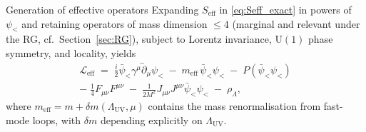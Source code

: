 \documentclass[11pt,a4paper]{article}
\theoremstyle{definition}
\theoremstyle{remark}
\begin{document}
	Generation of effective operators
		\label{prop:operators}
		Expanding $S_{\mathrm{eff}}$ in \eqref{eq:Seff_exact} in powers of $\psi_{<}$
		and retaining operators of mass dimension $\leq 4$ (marginal and relevant
		under the RG, cf.\ Section~\ref{sec:RG}), subject to Lorentz invariance,
		$\mathrm{U}(1)$ phase symmetry, and locality, yields
		\begin{multline}
			\mathcal{L}_{\mathrm{eff}}
			\;=\;
			\frac{i}{2}\bar{\psi}_{<}\gamma^\mu\overleftrightarrow{\partial}_\mu\psi_{<}
			\;-\; m_{\mathrm{eff}}\,\bar{\psi}_{<}\psi_{<}
			\;-\; P\!\left(\bar{\psi}_{<}\psi_{<}\right) \\
			-\; \frac{1}{4}F_{\mu\nu}F^{\mu\nu}
			\;-\; \frac{1}{2M^2}J_{\mu\nu}J^{\mu\nu}\bar{\psi}_{<}\psi_{<}
			\;-\; \rho_\Lambda,
			\label{eq:Leff}
		\end{multline}
		where $m_{\mathrm{eff}} = m + \delta m(\Lambda_{\mathrm{UV}},\mu)$ contains
		the mass renormalisation from fast-mode loops, with $\delta m$ depending
		explicitly on $\Lambda_{\mathrm{UV}}$.
	
\end{document}
